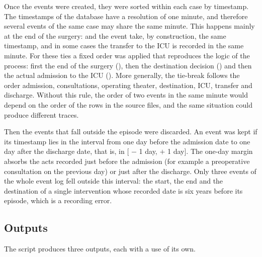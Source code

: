 Once the events were created, they were sorted within each case by timestamp. The timestamps of the database have a resolution of one minute, and therefore several events of the same case may share the same minute. This happens mainly at the end of the surgery:  and the  event take, by construction, the same timestamp, and in some cases the transfer to the ICU is recorded in the same minute. For these ties a fixed order was applied that reproduces the logic of the process: first the end of the surgery (), then the destination decision () and then the actual admission to the ICU (). More generally, the tie-break follows the order admission, consultations, operating theater, destination, ICU, transfer and discharge. Without this rule, the order of two events in the same minute would depend on the order of the rows in the source files, and the same situation could produce different traces.

Then the events that fall outside the episode were discarded. An event was kept if its timestamp lies in the interval from one day before the admission date to one day after the discharge date, that is, in [ $-$ 1 day,  $+$ 1 day]. The one-day margin absorbs the acts recorded just before the admission (for example a preoperative consultation on the previous day) or just after the discharge. Only three events of the whole event log fell outside this interval: the start, the end and the destination of a single intervention whose recorded date is six years before its episode, which is a recording error.

\subsection{Outputs}

The script produces three outputs, each with a use of its own.

